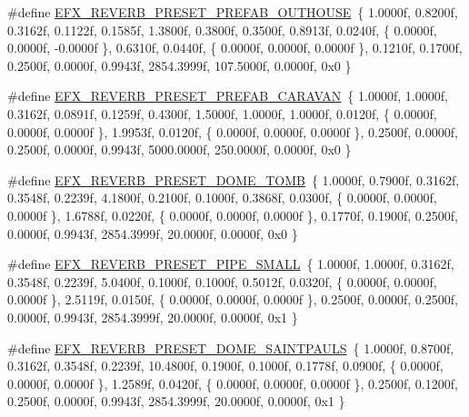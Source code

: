 \begin{DoxyCompactItemize}
\item 
\#define \mbox{\hyperlink{efx-presets_8h_a59f30910713319c0ac2d17319269e986}{E\+F\+X\+\_\+\+R\+E\+V\+E\+R\+B\+\_\+\+P\+R\+E\+S\+E\+T\+\_\+\+P\+R\+E\+F\+A\+B\+\_\+\+O\+U\+T\+H\+O\+U\+SE}}~\{ 1.\+0000f, 0.\+8200f, 0.\+3162f, 0.\+1122f, 0.\+1585f, 1.\+3800f, 0.\+3800f, 0.\+3500f, 0.\+8913f, 0.\+0240f, \{ 0.\+0000f, 0.\+0000f, -\/0.\+0000f \}, 0.\+6310f, 0.\+0440f, \{ 0.\+0000f, 0.\+0000f, 0.\+0000f \}, 0.\+1210f, 0.\+1700f, 0.\+2500f, 0.\+0000f, 0.\+9943f, 2854.\+3999f, 107.\+5000f, 0.\+0000f, 0x0 \}
\item 
\#define \mbox{\hyperlink{efx-presets_8h_aefbedf6a5b1126fe8108bc169192c889}{E\+F\+X\+\_\+\+R\+E\+V\+E\+R\+B\+\_\+\+P\+R\+E\+S\+E\+T\+\_\+\+P\+R\+E\+F\+A\+B\+\_\+\+C\+A\+R\+A\+V\+AN}}~\{ 1.\+0000f, 1.\+0000f, 0.\+3162f, 0.\+0891f, 0.\+1259f, 0.\+4300f, 1.\+5000f, 1.\+0000f, 1.\+0000f, 0.\+0120f, \{ 0.\+0000f, 0.\+0000f, 0.\+0000f \}, 1.\+9953f, 0.\+0120f, \{ 0.\+0000f, 0.\+0000f, 0.\+0000f \}, 0.\+2500f, 0.\+0000f, 0.\+2500f, 0.\+0000f, 0.\+9943f, 5000.\+0000f, 250.\+0000f, 0.\+0000f, 0x0 \}
\item 
\#define \mbox{\hyperlink{efx-presets_8h_a8172efac7fcdf447caf74b3588121f05}{E\+F\+X\+\_\+\+R\+E\+V\+E\+R\+B\+\_\+\+P\+R\+E\+S\+E\+T\+\_\+\+D\+O\+M\+E\+\_\+\+T\+O\+MB}}~\{ 1.\+0000f, 0.\+7900f, 0.\+3162f, 0.\+3548f, 0.\+2239f, 4.\+1800f, 0.\+2100f, 0.\+1000f, 0.\+3868f, 0.\+0300f, \{ 0.\+0000f, 0.\+0000f, 0.\+0000f \}, 1.\+6788f, 0.\+0220f, \{ 0.\+0000f, 0.\+0000f, 0.\+0000f \}, 0.\+1770f, 0.\+1900f, 0.\+2500f, 0.\+0000f, 0.\+9943f, 2854.\+3999f, 20.\+0000f, 0.\+0000f, 0x0 \}
\item 
\#define \mbox{\hyperlink{efx-presets_8h_a1965e441ad772bb05942baa1ffbd9297}{E\+F\+X\+\_\+\+R\+E\+V\+E\+R\+B\+\_\+\+P\+R\+E\+S\+E\+T\+\_\+\+P\+I\+P\+E\+\_\+\+S\+M\+A\+LL}}~\{ 1.\+0000f, 1.\+0000f, 0.\+3162f, 0.\+3548f, 0.\+2239f, 5.\+0400f, 0.\+1000f, 0.\+1000f, 0.\+5012f, 0.\+0320f, \{ 0.\+0000f, 0.\+0000f, 0.\+0000f \}, 2.\+5119f, 0.\+0150f, \{ 0.\+0000f, 0.\+0000f, 0.\+0000f \}, 0.\+2500f, 0.\+0000f, 0.\+2500f, 0.\+0000f, 0.\+9943f, 2854.\+3999f, 20.\+0000f, 0.\+0000f, 0x1 \}
\item 
\#define \mbox{\hyperlink{efx-presets_8h_a86a0f934e539989d9c39b390fd265e51}{E\+F\+X\+\_\+\+R\+E\+V\+E\+R\+B\+\_\+\+P\+R\+E\+S\+E\+T\+\_\+\+D\+O\+M\+E\+\_\+\+S\+A\+I\+N\+T\+P\+A\+U\+LS}}~\{ 1.\+0000f, 0.\+8700f, 0.\+3162f, 0.\+3548f, 0.\+2239f, 10.\+4800f, 0.\+1900f, 0.\+1000f, 0.\+1778f, 0.\+0900f, \{ 0.\+0000f, 0.\+0000f, 0.\+0000f \}, 1.\+2589f, 0.\+0420f, \{ 0.\+0000f, 0.\+0000f, 0.\+0000f \}, 0.\+2500f, 0.\+1200f, 0.\+2500f, 0.\+0000f, 0.\+9943f, 2854.\+3999f, 20.\+0000f, 0.\+0000f, 0x1 \}

\end{DoxyCompactItemize}
